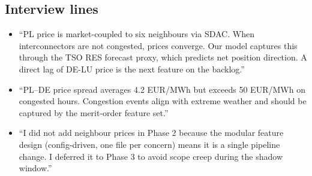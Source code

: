 \subsection{Interview lines}

\begin{itemize}
  \item ``PL price is market-coupled to six neighbours via SDAC. When
        interconnectors are not congested, prices converge. Our model
        captures this through the TSO RES forecast proxy, which predicts
        net position direction. A direct lag of DE-LU price is the next
        feature on the backlog.''
  \item ``PL--DE price spread averages 4.2 EUR/MWh but exceeds 50 EUR/MWh
        on congested hours. Congestion events align with extreme weather
        and should be captured by the merit-order feature set.''
  \item ``I did not add neighbour prices in Phase 2 because the modular
        feature design (config-driven, one file per concern) means it is
        a single pipeline change. I deferred it to Phase 3 to avoid
        scope creep during the shadow window.''
\end{itemize}
